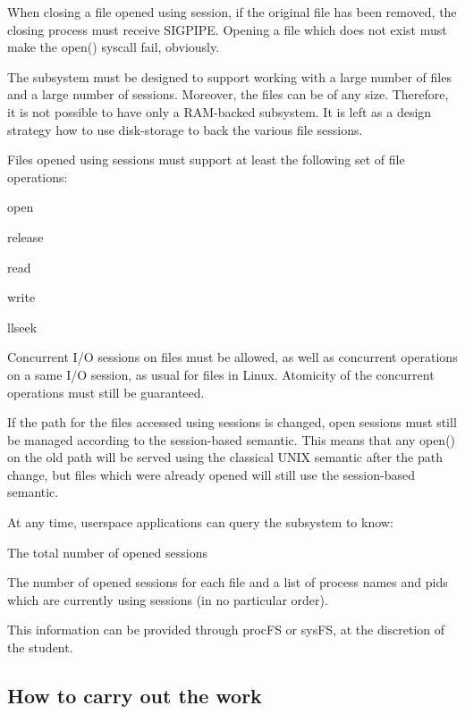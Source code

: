When closing a file opened using session, if the original file has been removed, the closing process must receive {\ttfamily S\+I\+G\+P\+I\+PE}. Opening a file which does not exist must make the {\ttfamily open()} syscall fail, obviously.

The subsystem must be designed to support working with a large number of files and a large number of sessions. Moreover, the files can be of any size. Therefore, it is not possible to have only a R\+A\+M-\/backed subsystem. It is left as a design strategy how to use disk-\/storage to back the various file sessions.

Files opened using sessions must support at least the following set of file operations\+:


\begin{DoxyItemize}
\item {\ttfamily open}
\item {\ttfamily release}
\item {\ttfamily read}
\item {\ttfamily write}
\item {\ttfamily llseek}
\end{DoxyItemize}

Concurrent I/O sessions on files must be allowed, as well as concurrent operations on a same I/O session, as usual for files in Linux. Atomicity of the concurrent operations must still be guaranteed.

If the path for the files accessed using sessions is changed, open sessions must still be managed according to the session-\/based semantic. This means that any {\ttfamily open()} on the old path will be served using the classical U\+N\+IX semantic after the path change, but files which were already opened will still use the session-\/based semantic.

At any time, userspace applications can query the subsystem to know\+:


\begin{DoxyItemize}
\item The total number of opened sessions
\item The number of opened sessions for each file and a list of process names and pids which are currently using sessions (in no particular order).
\end{DoxyItemize}

This information can be provided through {\ttfamily proc\+FS} or {\ttfamily sys\+FS}, at the discretion of the student.

\subsection*{How to carry out the work}

